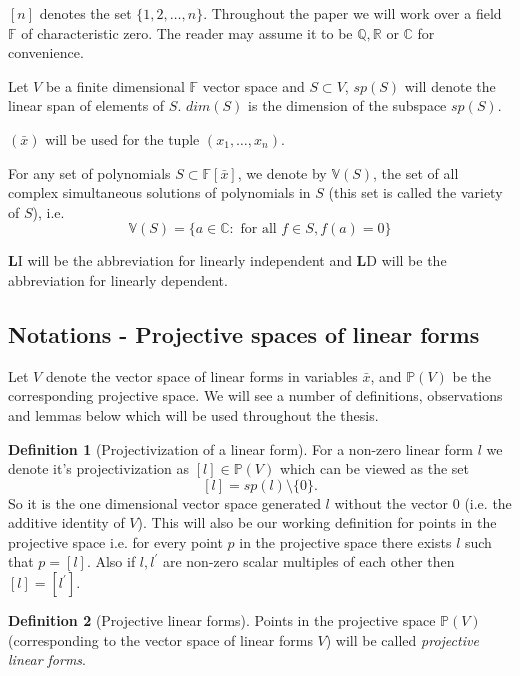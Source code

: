 \documentclass[12pt]{caltech_thesis}
\theoremstyle{plain}
\theoremstyle{definition}
\newtheorem{definition}{Definition}
\renewcommand{\bf}{\textbf}
\newcommand{\F}{\mathbb{F}}
\newcommand{\PP}{\mathbb{P}}
\newcommand{\C}{\mathbb{C}}
\newcommand{\Q}{\mathbb{Q}}
\newcommand{\R}{\mathbb{R}}
\newcommand{\B}[1]{\bar{#1}}
\begin{document}
$[n]$ denotes the set $\{1,2,\ldots,n\}$. Throughout the paper we will work over
a field $\F$ of characteristic zero. The reader may assume it to be $\Q,\R$ or $\C$ 
for convenience. 

Let $V$ be a finite dimensional $\F$ vector space and $S\subset V$, $sp(S)$ will
denote the linear span of elements of $S$. $dim(S)$ is the dimension of
the subspace $sp(S)$.


$(\B{x})$ will be used for the tuple $(x_1,\ldots,x_n)$.




 For any set of polynomials $S\subset \F[\B{x}]$, we denote by $\mathbb{V}(S)$,
the set of all complex simultaneous solutions of polynomials in $S$ (this set is called the variety of $S$), i.e.
\[
 \mathbb{V}(S) =\{a\in \C : \text{ for all } f\in S, f(a)=0 \}
\]


{\bf LI} will be the abbreviation for linearly independent and {\bf LD} will be
the abbreviation for linearly dependent.\\


\subsection{Notations - Projective spaces of linear forms}

Let $V$ denote the vector space of linear forms in variables $\B{x}$, and $\PP(V)$ be the corresponding projective space. 
We will see a number of definitions, observations and lemmas below which will be used throughout the thesis.

\begin{definition}[Projectivization of a linear form]\label{defn:projectivization}
 For a non-zero linear form $l$ we denote it's projectivization as $[l]\in \PP(V)$ which can be viewed as the set 
 \[
  [l] = sp(l)\setminus \{0\}.
 \]
So it is the one dimensional vector space generated $l$ without the vector $0$ (i.e. the additive identity of $V$). This will also be our working definition
for points in the projective space i.e. for every point $p$ in the projective space there exists $l$ such that $p=[l]$. Also if $l,l^\prime$
are non-zero scalar multiples of each other then $[l]=[l^\prime]$.
 
\end{definition}

\begin{definition}[Projective linear forms]
 Points in the projective space $\PP(V)$ (corresponding to the vector space of linear forms $V$) will be called
 \emph{projective linear forms}.
\end{definition}
\end{document}
